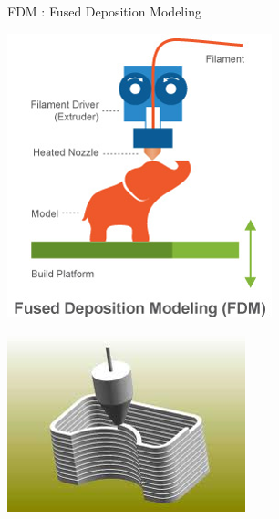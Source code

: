 \begin{frame}{FDM : Fused Deposition Modeling}

\begin{minipage}{.5\textwidth}
	\centering
		\includegraphics[width=0.8\linewidth]{images/FDM1}
	\label{fig:test1}
\end{minipage}%
\begin{minipage}{.5\textwidth}
	\centering
		\includegraphics[width=0.8\linewidth]{images/FDM2}\textbf{}
	\label{fig:test2}
\end{minipage}

\end{frame}


